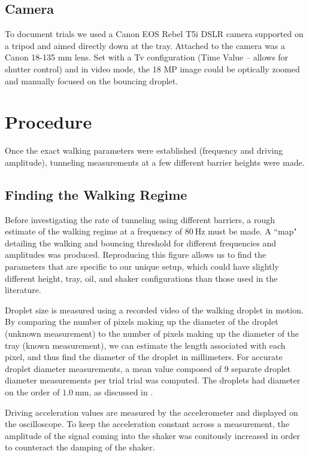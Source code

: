 \subsection{Camera}       
 
To document trials we used a Canon EOS Rebel T5i DSLR camera supported on a tripod and aimed directly down at the tray. Attached to the camera was a Canon 18-135 mm lens. Set with a Tv configuration (Time Value -- allows for shutter control) and in video mode, the 18 MP image could be optically zoomed and manually focused on the bouncing droplet. 

\section{Procedure}
Once the exact walking parameters were established (frequency and driving amplitude), tunneling measurements at a few different barrier heights were made. 

\subsection{Finding the Walking Regime}

Before investigating the rate of tunneling using different barriers, a rough estimate of the walking regime at a frequency of $80~\mathrm{Hz}$ must be made. A ``map" detailing the walking and bouncing threshold for different frequencies and amplitudes was produced. Reproducing this figure allows us to find the parameters that are specific to our unique setup, which could have slightly different height, tray, oil, and shaker configurations than those used in the literature. 

Droplet size is measured using a recorded video of the walking droplet in motion. By comparing the number of pixels making up the diameter of the droplet (unknown measurement) to the number of pixels making up the diameter of the tray (known measurement), we can estimate the length associated with  each pixel, and thus find the diameter of the droplet in millimeters. For accurate droplet diameter measurements, a mean value composed of 9 separate  droplet diameter measurements per trial trial was computed. The droplets had diameter on the order of $1.0~\mathrm{mm}$, as discussed in . 

Driving acceleration values are measured by the accelerometer and displayed on the oscilloscope. To keep the acceleration constant across a measurement, the amplitude of the signal coming into the shaker was conitously increased in order to counteract the damping of the shaker.

